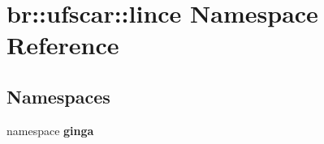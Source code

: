 \section{br::ufscar::lince Namespace Reference}
\label{namespacebr_1_1ufscar_1_1lince}


\subsection*{Namespaces}
\begin{CompactItemize}
\item 
namespace {\bf ginga}
\end{CompactItemize}
